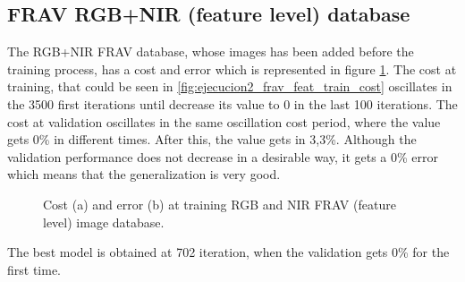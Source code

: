 \subsection{FRAV RGB+NIR (feature level) database}
The RGB+NIR FRAV database, whose images has been added before the training process, has a cost and error which is represented in figure \ref{fig:ejecucion2_frav_feat_train}. The cost at training, that could be seen in \ref{fig:ejecucion2_frav_feat_train_cost} oscillates in the 3500 first iterations until decrease its value to 0 in the last 100 iterations. The cost at validation oscillates in the same oscillation cost period, where the value gets 0\% in different times. After this, the value gets in 3,3\%. Although the validation performance does not decrease in a desirable way, it gets a 0\% error which means that the generalization is very good.\\
\begin{figure}[htb]
\centering
\caption{Cost (a) and error (b) at training RGB and NIR FRAV (feature level) image database.}
\label{fig:ejecucion2_frav_feat_train}
\end{figure}

The best model is obtained at 702 iteration, when the validation gets 0\% for the first time.

